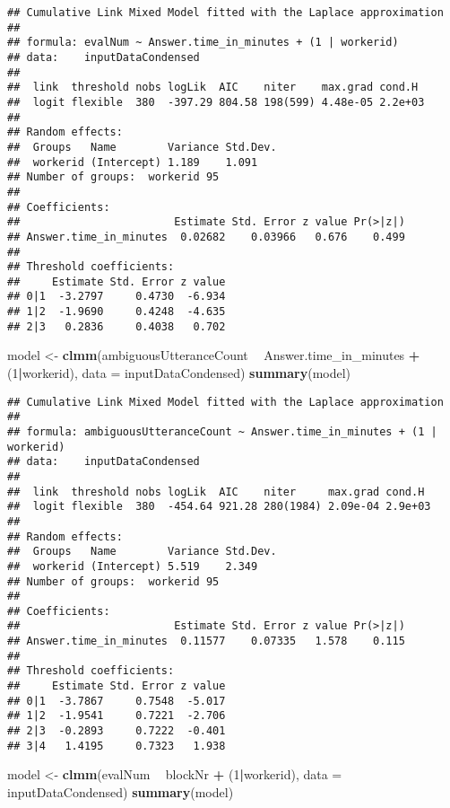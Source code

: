 \documentclass[]{article}
\newenvironment{Shaded}{\begin{snugshade}}{\end{snugshade}}
\newcommand{\DataTypeTok}[1]{\textcolor[rgb]{0.13,0.29,0.53}{#1}}
\newcommand{\DecValTok}[1]{\textcolor[rgb]{0.00,0.00,0.81}{#1}}
\newcommand{\KeywordTok}[1]{\textcolor[rgb]{0.13,0.29,0.53}{\textbf{#1}}}
\newcommand{\NormalTok}[1]{#1}
\newcommand{\OperatorTok}[1]{\textcolor[rgb]{0.81,0.36,0.00}{\textbf{#1}}}
\newcommand{\StringTok}[1]{\textcolor[rgb]{0.31,0.60,0.02}{#1}}
\begin{document}
\begin{verbatim}
## Cumulative Link Mixed Model fitted with the Laplace approximation
## 
## formula: evalNum ~ Answer.time_in_minutes + (1 | workerid)
## data:    inputDataCondensed
## 
##  link  threshold nobs logLik  AIC    niter    max.grad cond.H 
##  logit flexible  380  -397.29 804.58 198(599) 4.48e-05 2.2e+03
## 
## Random effects:
##  Groups   Name        Variance Std.Dev.
##  workerid (Intercept) 1.189    1.091   
## Number of groups:  workerid 95 
## 
## Coefficients:
##                        Estimate Std. Error z value Pr(>|z|)
## Answer.time_in_minutes  0.02682    0.03966   0.676    0.499
## 
## Threshold coefficients:
##     Estimate Std. Error z value
## 0|1  -3.2797     0.4730  -6.934
## 1|2  -1.9690     0.4248  -4.635
## 2|3   0.2836     0.4038   0.702
\end{verbatim}

\begin{Shaded}
\begin{Highlighting}[]
\NormalTok{model <-}\StringTok{ }\KeywordTok{clmm}\NormalTok{(ambiguousUtteranceCount }\OperatorTok{~}\StringTok{ }\NormalTok{Answer.time_in_minutes }\OperatorTok{+}\StringTok{ }\NormalTok{(}\DecValTok{1}\OperatorTok{|}\NormalTok{workerid), }\DataTypeTok{data =}\NormalTok{ inputDataCondensed)}
\KeywordTok{summary}\NormalTok{(model)}
\end{Highlighting}
\end{Shaded}

\begin{verbatim}
## Cumulative Link Mixed Model fitted with the Laplace approximation
## 
## formula: ambiguousUtteranceCount ~ Answer.time_in_minutes + (1 | workerid)
## data:    inputDataCondensed
## 
##  link  threshold nobs logLik  AIC    niter     max.grad cond.H 
##  logit flexible  380  -454.64 921.28 280(1984) 2.09e-04 2.9e+03
## 
## Random effects:
##  Groups   Name        Variance Std.Dev.
##  workerid (Intercept) 5.519    2.349   
## Number of groups:  workerid 95 
## 
## Coefficients:
##                        Estimate Std. Error z value Pr(>|z|)
## Answer.time_in_minutes  0.11577    0.07335   1.578    0.115
## 
## Threshold coefficients:
##     Estimate Std. Error z value
## 0|1  -3.7867     0.7548  -5.017
## 1|2  -1.9541     0.7221  -2.706
## 2|3  -0.2893     0.7222  -0.401
## 3|4   1.4195     0.7323   1.938
\end{verbatim}

\begin{Shaded}
\begin{Highlighting}[]
\NormalTok{model <-}\StringTok{ }\KeywordTok{clmm}\NormalTok{(evalNum }\OperatorTok{~}\StringTok{ }\NormalTok{blockNr }\OperatorTok{+}\StringTok{ }\NormalTok{(}\DecValTok{1}\OperatorTok{|}\NormalTok{workerid), }\DataTypeTok{data =}\NormalTok{ inputDataCondensed)}
\KeywordTok{summary}\NormalTok{(model)}
\end{Highlighting}
\end{Shaded}
\end{document}
